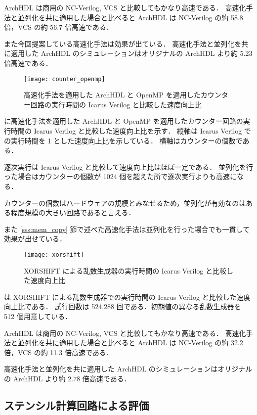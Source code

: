 ArchHDL は商用の NC-Verilog, VCS と比較してもかなり高速である．
高速化手法と並列化を共に適用した場合と比べると ArchHDL は NC-Verilog の約 58.8 倍，VCS の約 56.7 倍高速である．

また今回提案している高速化手法は効果が出ている．
高速化手法と並列化を共に適用した ArchHDL のシミュレーションはオリジナルの ArchHDL より約 5.23 倍高速である．



\begin{figure}[t]
 \centering
 \texttt{[image: counter\_openmp]}
 \caption{高速化手法を適用した ArchHDL と OpenMP を適用したカウンター回路の実行時間の Icarus Verilog と比較した速度向上比}
 \label{fig:counter_con}
\end{figure}

 に高速化手法を適用した ArchHDL と OpenMP を適用したカウンター回路の実行時間の Icarus Verilog と比較した速度向上比を示す．
縦軸は Icarus Verilog での実行時間を 1 とした速度向上比を示している．
横軸はカウンターの個数である．

逐次実行は Icarus Verilog と比較して速度向上比はほぼ一定である．
並列化を行った場合はカウンターの個数が 1024 個を超えた所で逐次実行よりも高速になる．

カウンターの個数はハードウェアの規模とみなせるため，並列化が有効なのはある程度規模の大きい回路であると言える．

また \ref{sss:mem_copy} 節で述べた高速化手法は並列化を行った場合でも一貫して効果が出せている．

\begin{figure}[t]
 \centering
 \texttt{[image: xorshift]}
 \caption{XORSHIFT による乱数生成器の実行時間の Icarus Verilog と比較した速度向上比}
 \label{fig:xorshift}
\end{figure}

 は XORSHIFT による乱数生成器での実行時間の Icarus Verilog と比較した速度向上比である．
試行回数は 524,288 回である．初期値の異なる乱数生成器を 512 個用意している．

ArchHDL は商用の NC-Verilog, VCS と比較してもかなり高速である．
高速化手法と並列化を共に適用した場合と比べると ArchHDL は NC-Verilog の約 32.2 倍，VCS の約 11.3 倍高速である．

高速化手法と並列化を共に適用した ArchHDL のシミュレーションはオリジナルの ArchHDL より約 2.78 倍高速である．


\subsection{ステンシル計算回路による評価}

